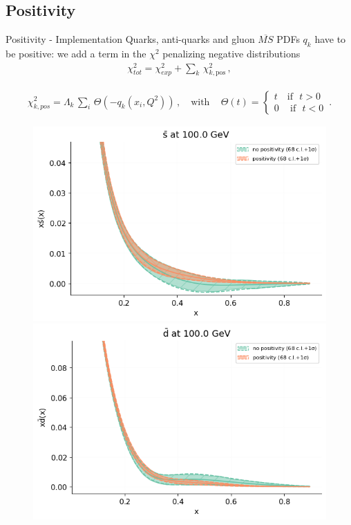\author[Tommaso Giani]{}
\subsection{Positivity}

\begin{frame}{Positivity - Implementation}
	Quarks, anti-quarks and gluon $\overline{MS}$ PDFs $q_k$ have to be positive: we add a term in the $\chi^2$ penalizing negative distributions
	\begin{align*}
		\label{eq:chi2pos_integ}
		\chi^2_{tot} = \chi^2_{exp} + \sum_k\, \chi^2_{k,\text{pos}}\,,
	\end{align*}

	\begin{align*}
		\chi^2_{k,pos} = \Lambda_k \,\sum_i \,\Theta\left(-q_k\left(x_i,Q^2\right)\right)\,,\,\,\,\,\,\,
		\text{with}\,\,\,\,\,\,\,
		\Theta\left(t\right) = 
		\begin{cases}
			t \,\,\,\,\,\,\text{if}\,\,\,\, t>0 \\
			0\,\,\,\,\,\,\,\text{if}\,\,\,\, t<0
		\end{cases}\,.
	\end{align*} 
	\begin{figure}[h!]
		\includegraphics[scale=0.32]{pos_integ/plot_pdfs_bars_pos.png}
		\includegraphics[scale=0.32]{pos_integ/plot_pdfs_bard_pos.png}
	\end{figure}
\end{frame}


